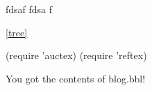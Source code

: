 fdsaf
fdsa
f



\ref{tree}

\cite{kitchin}

\label{tree}
(require 'auctex)
(require 'reftex)

You got the contents of blog.bbl!

